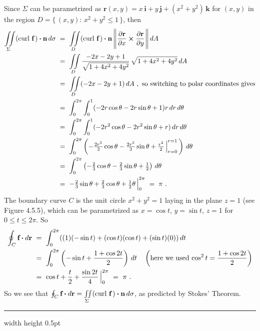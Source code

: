 \begin{exmp}
 \par\noindent
 Since $\Sigma$ can be parametrized as $\textbf{r}(x,y) = x\,\textbf{i}+y\,\textbf{j}+(x^2 + y^2 )\,\textbf{k}$ for
 $(x,y)$ in the region $D = \lbrace \, (x,y):\,x^2 + y^2 \le 1 \,\rbrace$, then
 \begin{align*}
  \iint\limits_{\Sigma} (\text{curl}~{\textbf{f}}\,) \bm{\cdot} \textbf{n}\,d\sigma ~&=~
   \iint\limits_{D} (\text{curl}~{\textbf{f}}\,) \bm{\cdot} \textbf{n}\,
   \Biggl\lVert\mspace{1mu}\frac{\partial \textbf{r}}{\partial x} \bm{\times} \frac{\partial \textbf{r}}{\partial y}\mspace{1mu}\Biggr\rVert\,dA\\
   &=~ \iint\limits_{D} \frac{-2x-2y+1}{\sqrt{1 + 4x^2 + 4y^2}}\,\sqrt{1 + 4x^2 + 4y^2}\,dA\\
   &=~ \iint\limits_{D} (-2x-2y+1)\,dA ~,~\text{so switching to polar coordinates gives}\\
   &=~ \int_0^{2\pi} \int_0^1 (-2r\cos \theta - 2r\sin \theta + 1)r\,dr\,d\theta\\
   &=~ \int_0^{2\pi} \int_0^1 (-2r^2 \cos \theta - 2r^2 \sin \theta + r)\,dr\,d\theta\\
   &=~ \int_0^{2\pi} \left( -\tfrac{2r^3}{3} \cos \theta - \tfrac{2r^3}{3} \sin \theta +
   \tfrac{r^2}{2}\,\Big|_{r=0}^{r=1} \,\right)\,d\theta\\
   &=~ \int_0^{2\pi} \left( -\tfrac{2}{3} \cos \theta - \tfrac{2}{3} \sin \theta + \tfrac{1}{2} \right)\,d\theta\\
   &=~ -\tfrac{2}{3} \sin \theta + \tfrac{2}{3} \cos \theta + \tfrac{1}{2}\theta\,\Big|_0^{2\pi} ~=~ \pi ~.
 \end{align*}
\newpage
 The boundary curve $C$ is the unit circle $x^2 + y^2 =1$ laying in the plane $z=1$ (see Figure 4.5.5), which can be
 parametrized as $x = \cos t$, $y = \sin t$, $z = 1$ for $0 \le t \le 2\pi$. So
 \begin{align*}
  \oint_{C} \textbf{f} \bm{\cdot} d\textbf{r} ~&=~ \int_0^{2\pi} ((1)(-\sin t) + (\cos t)(\cos t) + (\sin t)(0))\,dt\\
   &=~ \int_0^{2\pi} \left( -\sin t + \frac{1+\cos 2t}{2} \right) \,dt \quad \left( \text{here we used $\cos^2 t =
   \frac{1+\cos 2t}{2}$} \right)\\
   &=~ \cos t + \frac{t}{2} + \frac{\sin 2t}{4}\,\Big|_0^{2\pi} ~=~ \pi ~.
 \end{align*}
 So we see that $\oint_{C} \textbf{f} \bm{\cdot} d\textbf{r}=\iint\limits_{\Sigma} (\text{curl}~{\textbf{f}}\,) \bm{\cdot} \textbf{n}
 \,d\sigma$, as predicted by Stokes' Theorem.
\end{exmp}
\hrule width \textwidth height 0.5pt
\vspace{3mm}

